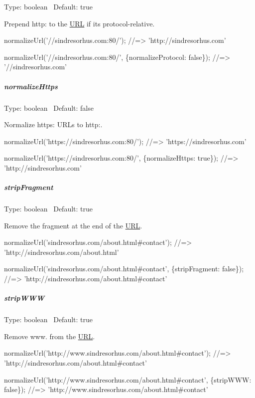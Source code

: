 Type\+: {\ttfamily boolean}~\newline
 Default\+: {\ttfamily true}

Prepend {\ttfamily http\+:} to the \mbox{\hyperlink{namespace_u_r_l}{U\+RL}} if it\textquotesingle{}s protocol-\/relative.


\begin{DoxyCode}
normalizeUrl('//sindresorhus.com:80/');
//=> 'http://sindresorhus.com'

normalizeUrl('//sindresorhus.com:80/', \{normalizeProtocol: false\});
//=> '//sindresorhus.com'
\end{DoxyCode}


\subparagraph*{normalize\+Https}

Type\+: {\ttfamily boolean}~\newline
 Default\+: {\ttfamily false}

Normalize {\ttfamily https\+:} U\+R\+Ls to {\ttfamily http\+:}.


\begin{DoxyCode}
normalizeUrl('https://sindresorhus.com:80/');
//=> 'https://sindresorhus.com'

normalizeUrl('https://sindresorhus.com:80/', \{normalizeHttps: true\});
//=> 'http://sindresorhus.com'
\end{DoxyCode}


\subparagraph*{strip\+Fragment}

Type\+: {\ttfamily boolean}~\newline
 Default\+: {\ttfamily true}

Remove the fragment at the end of the \mbox{\hyperlink{namespace_u_r_l}{U\+RL}}.


\begin{DoxyCode}
normalizeUrl('sindresorhus.com/about.html#contact');
//=> 'http://sindresorhus.com/about.html'

normalizeUrl('sindresorhus.com/about.html#contact', \{stripFragment: false\});
//=> 'http://sindresorhus.com/about.html#contact'
\end{DoxyCode}


\subparagraph*{strip\+W\+WW}

Type\+: {\ttfamily boolean}~\newline
 Default\+: {\ttfamily true}

Remove {\ttfamily www.} from the \mbox{\hyperlink{namespace_u_r_l}{U\+RL}}.


\begin{DoxyCode}
normalizeUrl('http://www.sindresorhus.com/about.html#contact');
//=> 'http://sindresorhus.com/about.html#contact'

normalizeUrl('http://www.sindresorhus.com/about.html#contact', \{stripWWW: false\});
//=> 'http://www.sindresorhus.com/about.html#contact'
\end{DoxyCode}


